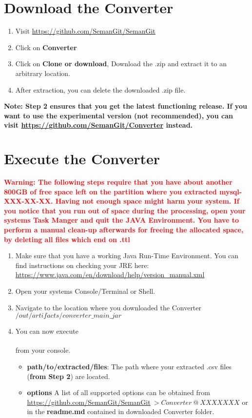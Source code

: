 \documentclass[11pt]{article}
\begin{document}
\section{Download the Converter}
\begin{enumerate}
\item Visit \url{https://github.com/SemanGit/SemanGit}
\item Click on \textbf{Converter} 
\item Click on \textbf{Clone or download}, Download the .zip and extract it to an arbitrary location.
\item After extraction, you can delete the downloaded .zip file.
\end{enumerate}
\textbf{Note: Step 2 ensures that you get the latest functioning release. If you want to use the experimental version (not recommended), you can visit  \url{https://github.com/SemanGit/Converter} instead.}

\section{Execute the Converter}
\textbf{\textcolor{red}{Warning: The following steps require that you have about another 800GB of free space left on the partition where you extracted mysql-XXX-XX-XX. Having not enough space might harm your system. If you notice that you run out of space during the processing, open your systems Task Manger and quit the JAVA Environment. You have to perform a manual clean-up afterwards for freeing the allocated space, by deleting all files which end on .ttl}}
\begin{enumerate}
\item Make sure that you have a working Java Run-Time Environment. You can find instructions on checking your JRE here: \url{https://www.java.com/en/download/help/version_manual.xml} 
\item Open your systems Console/Terminal or Shell.
\item Navigate to the location where you downloaded the Converter $/out/artifacts/converter\_main\_jar$
\item You can now execute \\[0.5cm]
\\[0.5cm]
from your console. 
\begin{itemize}
\item \textbf{path/to/extracted/files}: The path where your extracted .csv files (\textbf{from Step 2}) are located. 
\item \textbf{options} A list of all supported options can be obtained from 
\url{https://github.com/SemanGit/SemanGit}$~>Converter~ @~ XXXXXXX$
or in the \textbf{readme.md} contained in downloaded Converter folder.
\end{itemize}

\end{enumerate}
\newpage
{}


\end{document}
